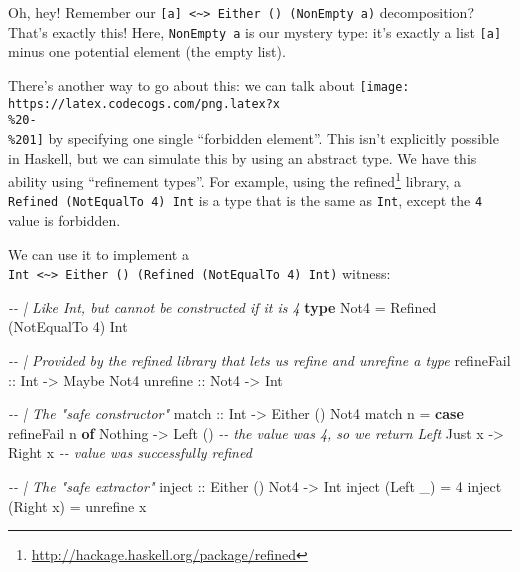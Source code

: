 \documentclass[]{article}
\newenvironment{Shaded}{}{}
\newcommand{\CommentTok}[1]{\textcolor[rgb]{0.38,0.63,0.69}{\textit{#1}}}
\newcommand{\DataTypeTok}[1]{\textcolor[rgb]{0.56,0.13,0.00}{#1}}
\newcommand{\DecValTok}[1]{\textcolor[rgb]{0.25,0.63,0.44}{#1}}
\newcommand{\KeywordTok}[1]{\textcolor[rgb]{0.00,0.44,0.13}{\textbf{#1}}}
\newcommand{\NormalTok}[1]{#1}
\newcommand{\OtherTok}[1]{\textcolor[rgb]{0.00,0.44,0.13}{#1}}
\renewcommand{\href}[2]{#2\footnote{\url{#1}}}
\begin{document}
Oh, hey! Remember our
\texttt{{[}a{]}\ \textless{}\textasciitilde{}\textgreater{}\ Either\ ()\ (NonEmpty\ a)}
decomposition? That's exactly this! Here, \texttt{NonEmpty\ a} is our mystery
type: it's exactly a list \texttt{{[}a{]}} minus one potential element (the
empty list).

There's another way to go about this: we can talk about
\texttt{[image: https://latex.codecogs.com/png.latex?x\\\%20-\\\%201]} by specifying
one single ``forbidden element''. This isn't explicitly possible in Haskell, but
we can simulate this by using an abstract type. We have this ability using
``refinement types''. For example, using the
\href{http://hackage.haskell.org/package/refined}{refined} library, a
\texttt{Refined\ (NotEqualTo\ 4)\ Int} is a type that is the same as
\texttt{Int}, except the \texttt{4} value is forbidden.

We can use it to implement a
\texttt{Int\ \textless{}\textasciitilde{}\textgreater{}\ Either\ ()\ (Refined\ (NotEqualTo\ 4)\ Int)}
witness:

\begin{Shaded}
\begin{Highlighting}[]
\CommentTok{{-}{-} | Like \textasciigrave{}Int\textasciigrave{}, but cannot be constructed if it is 4}
\KeywordTok{type} \DataTypeTok{Not4} \OtherTok{=} \DataTypeTok{Refined}\NormalTok{ (}\DataTypeTok{NotEqualTo} \DecValTok{4}\NormalTok{) }\DataTypeTok{Int}

\CommentTok{{-}{-} | Provided by the \textquotesingle{}refined\textquotesingle{} library that lets us refine and unrefine a type}
\OtherTok{refineFail ::} \DataTypeTok{Int}  \OtherTok{{-}>} \DataTypeTok{Maybe} \DataTypeTok{Not4}
\OtherTok{unrefine   ::} \DataTypeTok{Not4} \OtherTok{{-}>} \DataTypeTok{Int}


\CommentTok{{-}{-} | The "safe constructor"}
\OtherTok{match ::} \DataTypeTok{Int} \OtherTok{{-}>} \DataTypeTok{Either}\NormalTok{ () }\DataTypeTok{Not4}
\NormalTok{match n }\OtherTok{=} \KeywordTok{case}\NormalTok{ refineFail n }\KeywordTok{of}
    \DataTypeTok{Nothing} \OtherTok{{-}>} \DataTypeTok{Left}\NormalTok{ ()          }\CommentTok{{-}{-} the value was 4, so we return \textasciigrave{}Left\textasciigrave{}}
    \DataTypeTok{Just}\NormalTok{ x  }\OtherTok{{-}>} \DataTypeTok{Right}\NormalTok{ x          }\CommentTok{{-}{-} value was successfully refined}

\CommentTok{{-}{-} | The "safe extractor"}
\OtherTok{inject ::} \DataTypeTok{Either}\NormalTok{ () }\DataTypeTok{Not4} \OtherTok{{-}>} \DataTypeTok{Int}
\NormalTok{inject (}\DataTypeTok{Left}\NormalTok{  \_) }\OtherTok{=} \DecValTok{4}
\NormalTok{inject (}\DataTypeTok{Right}\NormalTok{ x) }\OtherTok{=}\NormalTok{ unrefine x}
\end{Highlighting}
\end{Shaded}
\end{document}
